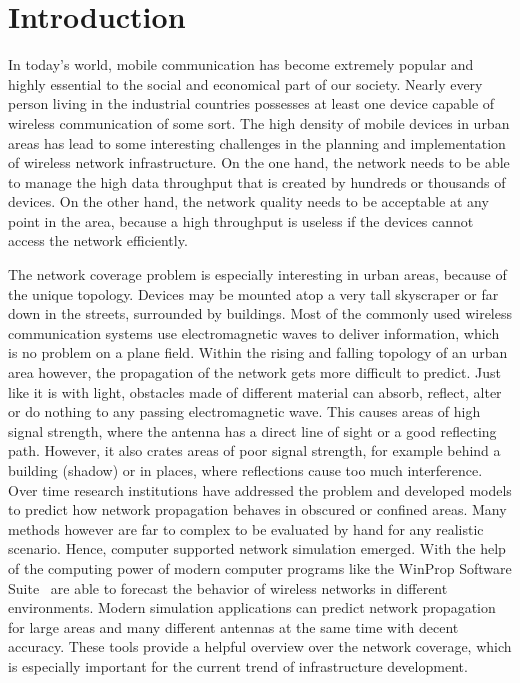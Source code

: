 \chapter{Introduction}
In today's world, mobile communication has become extremely popular and highly essential to the social and economical part of our society. Nearly every person living in the industrial countries possesses at least one device capable of wireless communication of some sort. The high density of mobile devices in urban areas has lead to some interesting challenges in the planning and implementation of wireless network infrastructure. On the one hand, the network needs to be able to manage the high data throughput that is created by hundreds or thousands of devices. On the other hand, the network quality needs to be acceptable at any point in the area, because a high throughput is useless if the devices cannot access the network efficiently.

The network coverage problem is especially interesting in urban areas, because of the unique topology. Devices may be mounted atop a very tall skyscraper or far down in the streets, surrounded by buildings. Most of the commonly used wireless communication systems use electromagnetic waves to deliver information, which is no problem on a plane field. Within the rising and falling topology of an urban area however, the propagation of the network gets more difficult to predict. Just like it is with light, obstacles made of different material can absorb, reflect, alter or do nothing to any passing electromagnetic wave. This causes areas of high signal strength, where the antenna has a direct line of sight or a good reflecting path. However, it also crates areas of poor signal strength, for example behind a building (shadow) or in places, where reflections cause too much interference. Over time research institutions have addressed the problem and developed models to predict how network propagation behaves in obscured or confined areas. Many methods however are far to complex to be evaluated by hand for any realistic scenario. Hence, computer supported network simulation emerged. With the help of the computing power of modern computer programs like the WinProp Software Suite~\cite{WinProp} are able to forecast the behavior of wireless networks in different environments. Modern simulation applications can predict network propagation for large areas and many different antennas at the same time with decent accuracy. These tools provide a helpful overview over the network coverage, which is especially important for the current trend of infrastructure development.

